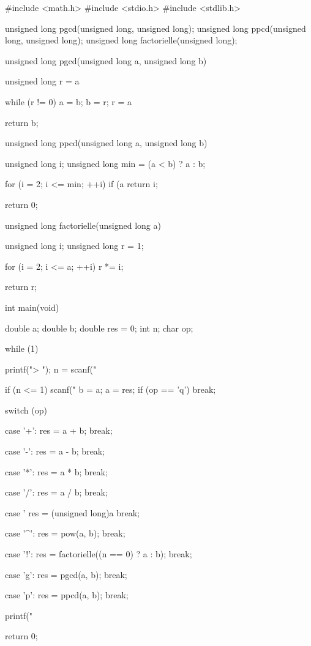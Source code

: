 \begin{C}
#include <math.h>
#include <stdio.h>
#include <stdlib.h>

unsigned long pgcd(unsigned long, unsigned long);
unsigned long ppcd(unsigned long, unsigned long);
unsigned long factorielle(unsigned long);


unsigned long pgcd(unsigned long a, unsigned long b)
{
    unsigned long r = a %

    while (r != 0)
    {
            a = b;
            b = r;
            r = a %
    }

    return b;
}


unsigned long ppcd(unsigned long a, unsigned long b)
{
    unsigned long i;
    unsigned long min = (a < b) ? a : b;

    for (i = 2; i <= min; ++i)
        if (a %
            return i;

    return 0;
}


unsigned long factorielle(unsigned long a)
{
    unsigned long i;
    unsigned long r = 1;

    for (i = 2; i <= a; ++i)
        r *= i;

    return r;
}


int
main(void)
{
    double a;
    double b;
    double res = 0;
    int n;
    char op;

    while (1)
    {
        printf("> ");
        n = scanf("%

        if (n <= 1)
        {
            scanf("%
            b = a;
            a = res;
        }
        if (op == 'q')
            break;

        switch (op)
        {
        case '+':
            res = a + b;
            break;

        case '-':
            res = a - b;
            break;

        case '*':
            res = a * b;
            break;

        case '/':
            res = a / b;
            break;

        case '%
            res = (unsigned long)a %
            break;

        case '^':
            res = pow(a, b);
            break;

        case '!':
            res = factorielle((n == 0) ? a : b);
            break;

        case 'g':
            res = pgcd(a, b);
            break;

        case 'p':
            res = ppcd(a, b);
            break;
        }

        printf("%
    }
    return 0;
}
\end{C}

